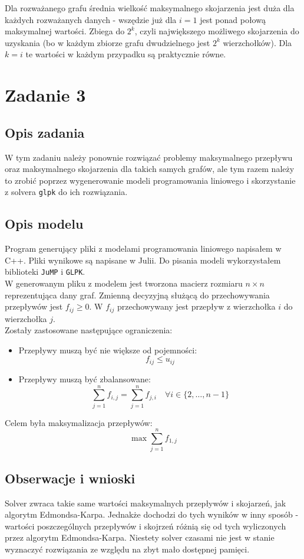 \documentclass{article}
\begin{document}
Dla rozważanego grafu średnia wielkość maksymalnego skojarzenia jest duża dla każdych rozważanych danych - wszędzie już dla $i=1$ jest ponad połową maksymalnej wartości.
Zbiega do $2^k$, czyli największego możliwego skojarzenia do uzyskania (bo w każdym zbiorze grafu dwudzielnego jest $2^k$ wierzchołków).
Dla $k = i$ te wartości w każdym przypadku są praktycznie równe.

\section{Zadanie 3}
\subsection{Opis zadania}
W tym zadaniu należy ponownie rozwiązać problemy maksymalnego przepływu oraz maksymalnego skojarzenia dla takich samych grafów, ale tym razem należy to zrobić poprzez wygenerowanie modeli programowania liniowego i skorzystanie z solvera \texttt{glpk} do ich rozwiązania.

\subsection{Opis modelu}
Program generujący pliki z modelami programowania liniowego napisałem w C++. Pliki wynikowe są napisane w Julii. Do pisania modeli wykorzystałem biblioteki \texttt{JuMP} i \texttt{GLPK}.\\

W generowanym pliku z modelem jest tworzona macierz rozmiaru $n \times n$ reprezentująca dany graf.
Zmienną decyzyjną służącą do przechowywania przepływów jest $f_{ij} \ge 0$. W $f_{ij}$ przechowywany jest przepływ z wierzchołka $i$ do wierzchołka $j$.\\

Zostały zastosowane następujące ograniczenia:
\begin{itemize}
    \item Przepływy muszą być nie większe od pojemności:
    $$
    f_{ij} \le u_{ij}
    $$
    \item Przepływy muszą być zbalansowane:
    $$
    \sum_{j=1}^n f_{i,j} = \sum_{j=1}^n f_{j,i} \quad \forall i \in \{2, \ldots, n-1\}
    $$
\end{itemize}

Celem była maksymalizacja przepływów:
$$
\max \sum_{j=1}^n f_{1,j}
$$

\subsection{Obserwacje i wnioski}
Solver zwraca takie same wartości maksymalnych przepływów i skojarzeń, jak algorytm Edmondsa-Karpa.
Jednakże dochodzi do tych wyników w inny sposób - wartości poszczególnych przepływów i skojrzeń różnią się od tych wyliczonych przez algorytm Edmondsa-Karpa.
Niestety solver czasami nie jest w stanie wyznaczyć rozwiązania ze względu na zbyt mało dostępnej pamięci.\\
\end{document}
